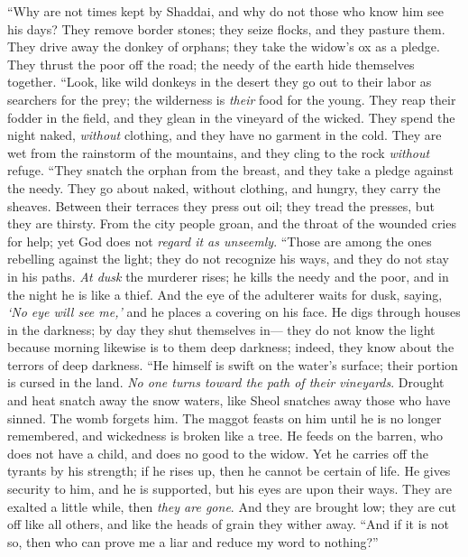 \begin{biblechapter} %
 “Why are not times kept by Shaddai, 
and why do not those who know him see his days?
\verse They remove border stones; 
they seize flocks, and they pasture them.
\verse They drive away the donkey of orphans; 
they take the widow’s ox as a pledge.
\verse They thrust the poor off the road; 
the needy of the earth hide themselves together.
\verse “Look, like wild donkeys in the desert 
they go out to their labor as searchers for the prey; 
the wilderness is \textit{their} food for the young.
\verse They reap their fodder in the field, 
and they glean in the vineyard of the wicked.
\verse They spend the night naked, \textit{without} clothing, 
and they have no garment in the cold.
\verse They are wet from the rainstorm of the mountains, 
and they cling to the rock \textit{without} refuge.
\verse “They snatch the orphan from the breast, 
and they take a pledge against the needy.
\verse They go about naked, without clothing, 
and hungry, they carry the sheaves.
\verse Between their terraces they press out oil; 
they tread the presses, but they are thirsty.
\verse From the city people groan, 
and the throat of the wounded cries for help; 
yet God does not \textit{regard it as unseemly}.
\verse “Those are among the ones rebelling against the light; 
they do not recognize his ways, 
and they do not stay in his paths.
\verse \textit{At dusk} the murderer rises; 
he kills the needy and the poor, 
and in the night he is like a thief.
\verse And the eye of the adulterer waits for dusk, 
saying, \textit{‘No eye will see me,’} 
and he places a covering on his face.
\verse He digs through houses in the darkness; 
by day they shut themselves in— 
they do not know the light
\verse because morning likewise is to them deep darkness; 
indeed, they know about the terrors of deep darkness.
\verse “He himself is swift on the water’s surface; 
their portion is cursed in the land. 
\textit{No one turns toward the path of their vineyards}.
\verse Drought and heat snatch away the snow waters, 
like Sheol snatches away those who have sinned.
\verse The womb forgets him. 
The maggot feasts on him until he is no longer remembered, 
and wickedness is broken like a tree.
\verse He feeds on the barren, who does not have a child, 
and does no good to the widow.
\verse Yet he carries off the tyrants by his strength; 
if he rises up, then he cannot be certain of life.
\verse He gives security to him, and he is supported, 
but his eyes are upon their ways.
\verse They are exalted a little while, then \textit{they are gone}. 
And they are brought low; they are cut off like all others, 
and like the heads of grain they wither away.
\verse “And if it is not so, then who can prove me a liar 
and reduce my word to nothing?”
\end{biblechapter}

